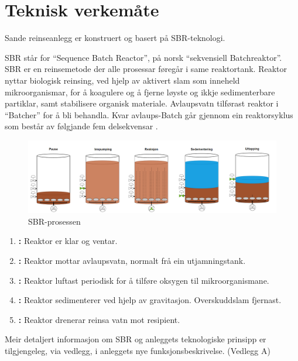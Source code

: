 \newpage
\section{Teknisk verkemåte}
\thispagestyle{fancy}
Sande reinseanlegg er konstruert og basert på \gls{SBR}-teknologi.

\gls{SBR} står for ``Sequence \Gls{Batch} Reactor'', på norsk ``sekvensiell \gls{Batch}reaktor''.\newline
\gls{SBR} er en reinsemetode der alle prosessar føregår i same reaktortank. 
Reaktor nyttar biologisk reinsing, ved hjelp av aktivert slam som inneheld mikroorganismar, for å koagulere 
og å fjerne løyste og ikkje sedimenterbare partiklar, samt stabilisere organisk materiale. 
Avlaupsvatn tilførast reaktor i ``\gls{Batch}er'' for å bli behandla. 
Kvar avlaups-\gls{Batch} går gjennom ein reaktorsyklus som består av følgjande fem delsekvensar \citep{Statsforvalter}.
\newline

\begin{figure}[htbp]
    \centering
    \includegraphics[width=1\textwidth]{Figurar/SBR-V2.png}
    \caption{\gls{SBR}-prosessen}\label{fig:SBR-Prosessen}
\end{figure}


\begin{enumerate}
    \item \textbf{:} Reaktor er klar og ventar.
    \item \textbf{:} Reaktor mottar avlaupsvatn, normalt frå ein utjamningstank.
    \item \textbf{:} Reaktor luftast periodisk for å tilføre oksygen til mikroorganismane.
    \item \textbf{:} Reaktor sedimenterer ved hjelp av gravitasjon. Overskuddslam fjernast.
    \item \textbf{:} Reaktor drenerar reinsa vatn mot resipient.
\end{enumerate}

Meir detaljert informasjon om \gls{SBR} og anleggets teknologiske prinsipp er tilgjengeleg, via vedlegg, i anleggets nye
funksjonsbeskrivelse. (Vedlegg A)

